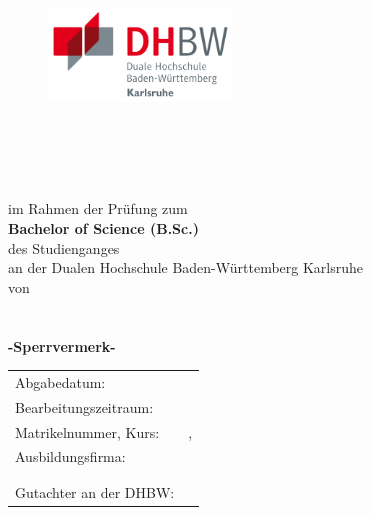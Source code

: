 \thispagestyle{empty}
\begin{titlepage}
\enlargethispage{4cm}

\begin{figure}                    %
	\hfill
	\begin{minipage}{0.49\textwidth}
		\flushright
		\includegraphics[height=2.5cm]{Bilder/Logos/Logo_DHBW.pdf} 
	\end{minipage}
\end{figure} 
\vspace*{0.1cm}

\begin{center}
	\huge{\textbf{\titel}}\\
	\huge{\textbf{\titelcaption}}\\[1.5cm]
	\Large{\textbf{\subtitel}}\\[0.5cm]
	\Large{\textbf{\arbeit}}\\[0.5cm]
	\normalsize{im Rahmen der Prüfung zum\\[1ex] \textbf{Bachelor of Science (B.Sc.)}}\\[0.5cm]
	\Large{des Studienganges \studiengang}\\[1ex]
	\normalsize{an der Dualen Hochschule Baden-Württemberg Karlsruhe}\\[1cm]
	\normalsize{von}\\[1ex] \Large{\textbf{\autor}} \\[1cm]
	\normalsize{\bearbeitungsmonat}\\[1ex] \Large{\textbf{-Sperrvermerk-}}\\[0.5cm]
\end{center}

\begin{center}
	\begin{tabular}{ll}
		Abgabedatum:                     & \abgabe \\[0.2cm]
		Bearbeitungszeitraum:            & \bearbeitungszeitraum \\[0.2cm]
		Matrikelnummer, Kurs:            & \matrikelnr , \kurs \\[0.2cm]
		Ausbildungsfirma:                & \firmaName \\
		                                 & \firmaStrasse \\
		                                 & \firmaPlz \\[0.2cm]
		Gutachter an der DHBW:           & \betreuerDhbw \\[0.2cm]
	\end{tabular} 
\end{center}
\end{titlepage}